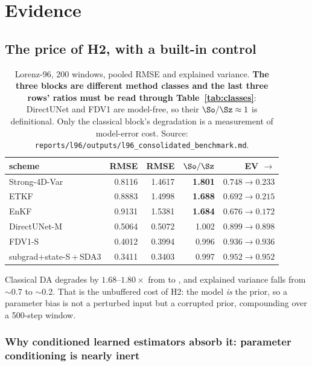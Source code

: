 \section{Evidence}
\label{sec:evidence}

\subsection{The price of H2, with a built-in control}
\label{sec:price}

\begin{table}[t]
\centering
\small
\begin{tabular}{@{}lrrrr@{}}
\toprule
\textbf{scheme} & \textbf{\Sz{} RMSE} & \textbf{\So{} RMSE} & $\So/\Sz$ & \textbf{EV \Sz{} $\to$ \So{}} \\
\midrule
Strong-4D-Var          & 0.8116 & 1.4617 & \textbf{1.801} & $0.748 \to 0.233$ \\
ETKF                   & 0.8883 & 1.4998 & \textbf{1.688} & $0.692 \to 0.215$ \\
EnKF                   & 0.9131 & 1.5381 & \textbf{1.684} & $0.676 \to 0.172$ \\
\addlinespace
DirectUNet-M           & 0.5064 & 0.5072 & 1.002 & $0.899 \to 0.898$ \\
FDV1-S                 & 0.4012 & 0.3994 & 0.996 & $0.936 \to 0.936$ \\
subgrad+state-S\,+\,SDA3 & 0.3411 & 0.3403 & 0.997 & $0.952 \to 0.952$ \\
\bottomrule
\end{tabular}
\caption{Lorenz-96, 200 windows, pooled RMSE and explained variance.
\textbf{The three blocks are different method classes and the last three rows'
ratios must be read through Table~\ref{tab:classes}}: DirectUNet and FDV1 are
model-free, so their $\So/\Sz \approx 1$ is definitional. Only the classical
block's degradation is a measurement of model-error cost.
Source: \texttt{reports/l96/outputs/l96\_consolidated\_benchmark.md}.}
\label{tab:price}
\end{table}

Classical DA degrades by $1.68$--$1.80\times$ from \Sz{} to \So{}, and explained
variance falls from $\sim$0.7 to $\sim$0.2. That is the unbuffered cost of H2:
the model \emph{is} the prior, so a parameter bias is not a perturbed input but
a corrupted prior, compounding over a 500-step window.

\subsubsection{Why conditioned learned estimators absorb it: parameter
conditioning is nearly inert}
\label{sec:inert}

